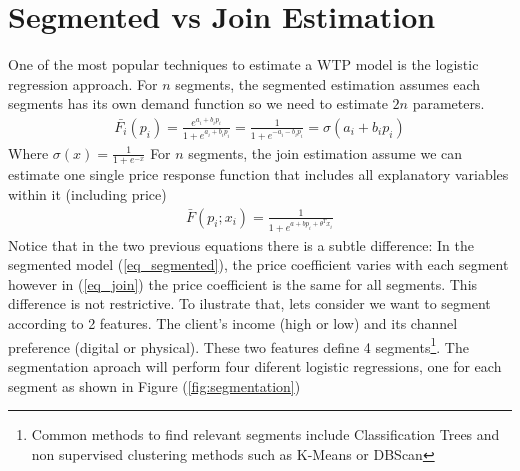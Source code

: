 \section{Segmented vs Join Estimation \label{sec:takeuprate}}
One of the most popular techniques to estimate a WTP model is the logistic regression approach. 
For $n$ segments, the segmented estimation assumes each segments has its own demand function so we need to estimate $2n$ parameters.
\begin{align}
\bar{F_i}(p_i)=\frac{e^{a_i+b_i p_i}}{1+e^{a_i+b_i p_i}} =\frac{1}{1+e^{-a_i-b_i p_i}} = \sigma(a_i+b_ip_i) \label{eq_segmented}
\end{align}
Where $\sigma(x)=\frac{1}{1+e^{-x}}$
For $n$ segments, the join estimation assume we can estimate one single price response function that includes all explanatory variables within it (including price)
\begin{align}
\bar{F}(p_i;x_i)=\frac{1}{1+e^{a+b p_i+\theta^T x_i}} \label{eq_join}
\end{align}
Notice that in the two previous equations there is a subtle difference: In the segmented model (\ref{eq_segmented}), the price coefficient varies with each segment however in (\ref{eq_join}) the price coefficient is the same for all segments. This difference is not restrictive. To ilustrate that, lets consider we want to segment according to 2 features. The client's income (high or low) and its channel preference (digital or physical). These two features define 4 segments\footnote{ Common methods to find relevant segments include Classification Trees and non supervised clustering methods such as K-Means or DBScan}. The segmentation aproach will perform four diferent logistic regressions, one for each segment as shown in Figure (\ref{fig:segmentation})


